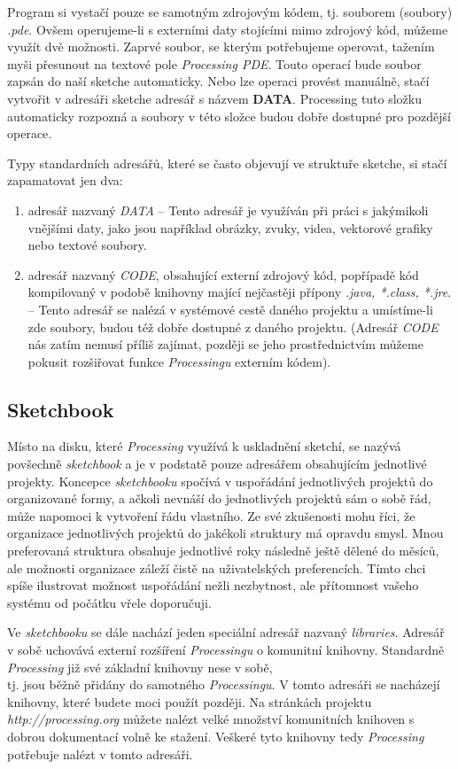 \documentclass[10pt,twoside=true,open=right,cleardoublepage=empty,chapterprefix=true]{scrbook}
\newcommand{\pododdil}[1]{\subsection{#1}\index{#1}\label{#1}}
\newcommand{\slovnik}[1]{\textbf{\gls{#1}}\index{#1}\label{#1}}
\begin{document}
Program si vystačí pouze se samotným zdrojovým kódem, tj. souborem (soubory) {\em *.pde}. Ovšem operujeme-li s externími daty stojícími mimo zdrojový kód, můžeme využít dvě možnosti. Zaprvé soubor, se kterým potřebujeme operovat, tažením myši přesunout na textové pole {\em Processing PDE}. Touto operací bude soubor zapsán do naší sketche automaticky. Nebo lze operaci provést manuálně, stačí vytvořit v adresáři sketche adresář s názvem \slovnik{DATA}. Processing tuto složku automaticky rozpozná a soubory v této složce budou dobře dostupné pro pozdější operace.

Typy standardních adresářů, které se často objevují ve struktuře sketche, si stačí zapamatovat jen dva:

\begin{enumerate}
\item
adresář nazvaný {\em DATA} -- Tento adresář je využíván při práci s jakýmikoli vnějšími daty, jako jsou například obrázky, zvuky, videa, vektorové grafiky nebo textové soubory.

\item
adresář nazvaný {\em CODE}, obsahující externí zdrojový kód, popřípadě kód kompilovaný v podobě knihovny mající nejčastěji přípony {\em *.java, *.class, *.jre}. -- Tento adresář se nalézá v systémové cestě daného projektu a umístíme-li zde soubory, budou též dobře dostupné z daného projektu. (Adresář {\em CODE} nás zatím nemusí příliš zajímat, později se jeho prostřednictvím můžeme pokusit rozšiřovat funkce {\em Processingu} externím kódem).

\end{enumerate}


\pododdil{Sketchbook}

Místo na disku, které {\em Processing} využívá k uskladnění sketchí, se nazývá povšechně {\em sketchbook} a je v podstatě pouze adresářem obsahujícím jednotlivé projekty. Koncepce {\em sketchbooku} spočívá v uspořádání jednotlivých projektů do organizované formy, a ačkoli nevnáší do jednotlivých projektů sám o sobě řád, může napomoci k vytvoření řádu vlastního. Ze své zkušenosti mohu říci, že organizace jednotlivých projektů do jakékoli struktury má opravdu smysl. Mnou preferovaná struktura obsahuje jednotlivé roky následně ještě dělené do měsíců, ale možnosti organizace záleží čistě na uživatelských preferencích. Tímto chci spíše ilustrovat možnost uspořádání nežli nezbytnost, ale přítomnost vašeho systému od počátku vřele doporučuji.

Ve {\em sketchbooku} se dále nachází jeden speciální adresář nazvaný {\em libraries}. Adresář v sobě uchovává externí rozšíření {\em Processingu} o komunitní knihovny. Standardně {\em Processing} již své základní knihovny nese v sobě, \\tj. jsou běžně přidány do samotného {\em Processingu}. V tomto adresáři se nacházejí knihovny, které budete moci použít později. Na stránkách projektu {\em http://processing.org} můžete nalézt velké množství komunitních knihoven s dobrou dokumentací volně ke stažení. Veškeré tyto knihovny tedy {\em Processing} potřebuje nalézt v tomto adresáři.
\end{document}
